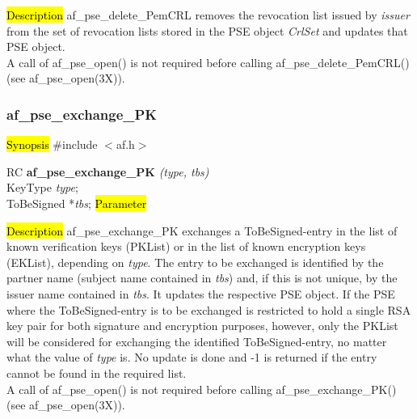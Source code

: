 \hl{Description}
af\_pse\_delete\_PemCRL removes the revocation list issued by {\em issuer} from the set
of revocation lists stored in the PSE object {\em CrlSet} and updates that PSE object. 
\\ [1em]
A call of af\_pse\_open() is not required before calling af\_pse\_delete\_PemCRL()
(see af\_pse\_open(3X)).



\subsubsection{af\_pse\_exchange\_PK}
\label{af_change_PK}
\hl{Synopsis}
\#include $<$af.h$>$

RC {\bf af\_pse\_exchange\_PK} {\em (type, tbs)} \\
KeyType {\em type}; \\
ToBeSigned *{\em tbs};
\hl{Parameter}


\hl{Description}
af\_pse\_exchange\_PK exchanges a ToBeSigned-entry in the list of known 
verification keys (PKList) or in the list of known encryption keys (EKList), depending
on {\em type}. The entry to be exchanged is identified by the partner name (subject name
contained in {\em tbs}) and, if this is not unique, by the issuer name contained in {\em tbs}.
It updates the respective PSE object.
If the PSE where the ToBeSigned-entry is to be exchanged is restricted to hold a single RSA key pair
for both signature and encryption purposes, however, only the PKList will be considered for exchanging the identified ToBeSigned-entry,
no matter what the value of {\em type} is.
No update is done and -1 is returned if
the entry cannot be found in the required list.
\\ [1em]
A call of af\_pse\_open() is not required before calling af\_pse\_exchange\_PK()
(see af\_pse\_open(3X)).

